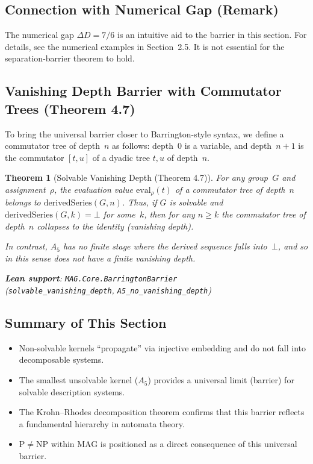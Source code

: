\documentclass[11pt,a4paper]{article}
\theoremstyle{plain}
\newtheorem{theorem}{Theorem}[section]
\theoremstyle{definition}
\newcommand{\Aalt}{A_5}
\newcommand{\lean}[1]{\texttt{#1}}
\begin{document}
\subsection{Connection with Numerical Gap (Remark)}

The numerical gap $\Delta D = 7/6$ is an intuitive aid to the barrier in this section. For details, see the numerical examples in Section~2.5. It is not essential for the separation-barrier theorem to hold.

\subsection{Vanishing Depth Barrier with Commutator Trees (Theorem 4.7)}

To bring the universal barrier closer to Barrington-style syntax, we define a commutator tree of depth~$n$ as follows: depth~0 is a variable, and depth~$n+1$ is the commutator $[t,u]$ of a dyadic tree $t,u$ of depth~$n$.

\begin{theorem}[Solvable Vanishing Depth (Theorem 4.7)]
For any group~$G$ and assignment~$\rho$, the evaluation value $\mathrm{eval}_\rho(t)$ of a commutator tree of depth~$n$ belongs to $\mathrm{derivedSeries}(G,n)$. Thus, if $G$ is solvable and $\mathrm{derivedSeries}(G,k) = \bot$ for some~$k$, then for any $n \geq k$ the commutator tree of depth~$n$ collapses to the identity (vanishing depth).

In contrast, $\Aalt$ has no finite stage where the derived sequence falls into~$\bot$, and so in this sense does not have a finite vanishing depth.

\textbf{Lean support}: \lean{MAG.Core.BarringtonBarrier}\\ (\lean{solvable\_vanishing\_depth}, \lean{A5\_no\_vanishing\_depth})
\end{theorem}

\subsection{Summary of This Section}

\begin{itemize}[nosep]
\item Non-solvable kernels ``propagate'' via injective embedding and do not fall into decomposable systems.
\item The smallest unsolvable kernel ($\Aalt$) provides a universal limit (barrier) for solvable description systems.
\item The Krohn--Rhodes decomposition theorem confirms that this barrier reflects a fundamental hierarchy in automata theory.
\item $\mathrm{P} \neq \mathrm{NP}$ within MAG is positioned as a direct consequence of this universal barrier.
\end{itemize}
\end{document}
